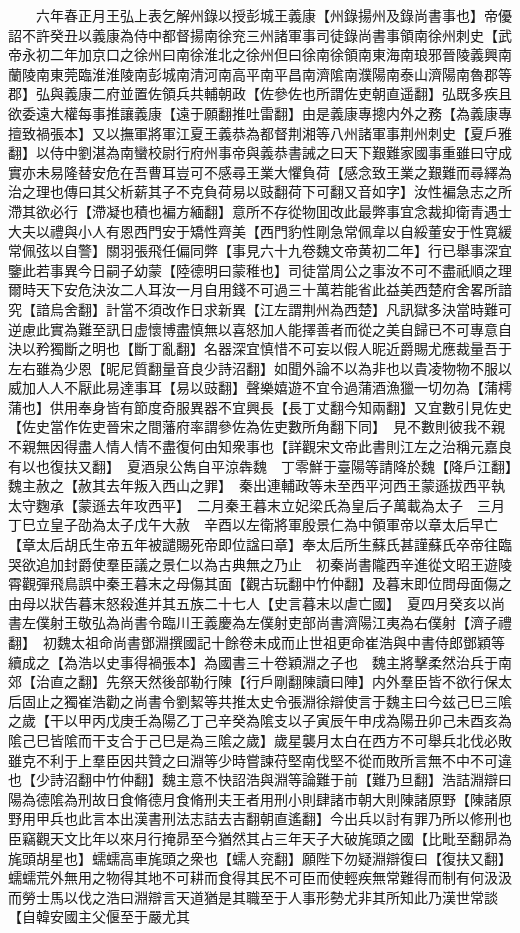 　　六年春正月王弘上表乞解州錄以授彭城王義康【州錄揚州及錄尚書事也】帝優詔不許癸丑以義康為侍中都督揚南徐兖三州諸軍事司徒錄尚書事領南徐州刺史【武帝永初二年加京口之徐州曰南徐淮北之徐州但曰徐南徐領南東海南琅邪晉陵義興南蘭陵南東莞臨淮淮陵南彭城南清河南高平南平昌南濟隂南濮陽南泰山濟陽南魯郡等郡】弘與義康二府並置佐領兵共輔朝政【佐參佐也所謂佐吏朝直遥翻】弘既多疾且欲委遠大權每事推讓義康【遠于願翻推吐雷翻】由是義康專摠内外之務【為義康專擅致禍張本】又以撫軍將軍江夏王義恭為都督荆湘等八州諸軍事荆州刺史【夏戶雅翻】以侍中劉湛為南蠻校尉行府州事帝與義恭書誡之曰天下艱難家國事重雖曰守成實亦未易隆替安危在吾曹耳豈可不感尋王業大懼負荷【感念致王業之艱難而尋繹為治之理也傳曰其父析薪其子不克負荷易以豉翻荷下可翻又音如字】汝性褊急志之所滯其欲必行【滯凝也積也褊方緬翻】意所不存從物囬改此最弊事宜念裁抑衛青遇士大夫以禮與小人有恩西門安于矯性齊美【西門豹性剛急常佩韋以自綏董安于性寛緩常佩弦以自警】關羽張飛任偏同弊【事見六十九卷魏文帝黄初二年】行已舉事深宜鑒此若事異今日嗣子幼蒙【陸德明曰蒙稚也】司徒當周公之事汝不可不盡祇順之理爾時天下安危決汝二人耳汝一月自用錢不可過三十萬若能省此益美西楚府舍畧所諳究【諳烏舍翻】計當不須改作日求新異【江左謂荆州為西楚】凡訊獄多決當時難可逆慮此實為難至訊日虚懷博盡慎無以喜怒加人能擇善者而從之美自歸已不可專意自決以矜獨斷之明也【斷丁亂翻】名器深宜慎惜不可妄以假人昵近爵賜尤應裁量吾于左右雖為少恩【昵尼質翻量音良少詩沼翻】如聞外論不以為非也以貴凌物物不服以威加人人不厭此易達事耳【易以豉翻】聲樂嬉遊不宜令過蒲酒漁獵一切勿為【蒲樗蒲也】供用奉身皆有節度奇服異器不宜興長【長丁丈翻今知兩翻】又宜數引見佐史【佐史當作佐吏晉宋之間藩府率謂參佐為佐吏數所角翻下同】　見不數則彼我不親不親無因得盡人情人情不盡復何由知衆事也【詳觀宋文帝此書則江左之治稱元嘉良有以也復扶又翻】　夏酒泉公雋自平涼犇魏　丁零鮮于臺陽等請降於魏【降戶江翻】魏主赦之【赦其去年叛入西山之罪】　秦出連輔政等未至西平河西王蒙遜拔西平執太守麴承【蒙遜去年攻西平】　二月秦王暮末立妃梁氏為皇后子萬載為太子　三月丁巳立皇子劭為太子戊午大赦　辛酉以左衛將軍殷景仁為中領軍帝以章太后早亡【章太后胡氏生帝五年被譴賜死帝即位諡曰章】奉太后所生蘇氏甚謹蘇氏卒帝往臨哭欲追加封爵使羣臣議之景仁以為古典無之乃止　初秦尚書隴西辛進從文昭王遊陵霄觀彈飛鳥誤中秦王暮末之母傷其面【觀古玩翻中竹仲翻】及暮末即位問母面傷之由母以狀告暮末怒殺進并其五族二十七人【史言暮末以虐亡國】　夏四月癸亥以尚書左僕射王敬弘為尚書令臨川王義慶為左僕射吏部尚書濟陽江夷為右僕射【濟子禮翻】　初魏太祖命尚書鄧淵撰國記十餘卷未成而止世祖更命崔浩與中書侍郎鄧穎等續成之【為浩以史事得禍張本】為國書三十卷穎淵之子也　魏主將擊柔然治兵于南郊【治直之翻】先祭天然後部勒行陳【行戶剛翻陳讀曰陣】内外羣臣皆不欲行保太后固止之獨崔浩勸之尚書令劉絜等共推太史令張淵徐辯使言于魏主曰今兹己巳三隂之歲【干以甲丙戊庚壬為陽乙丁己辛癸為隂支以子寅辰午申戌為陽丑卯己未酉亥為隂己巳皆隂而干支合于己巳是為三隂之歲】歲星襲月太白在西方不可舉兵北伐必敗雖克不利于上羣臣因共贊之曰淵等少時嘗諫苻堅南伐堅不從而敗所言無不中不可違也【少詩沼翻中竹仲翻】魏主意不快詔浩與淵等論難于前【難乃旦翻】浩詰淵辯曰陽為德隂為刑故日食脩德月食脩刑夫王者用刑小則肆諸市朝大則陳諸原野【陳諸原野用甲兵也此言本出漢書刑法志詰去吉翻朝直遙翻】今出兵以討有罪乃所以修刑也臣竊觀天文比年以來月行掩昴至今猶然其占三年天子大破旄頭之國【比毗至翻昴為旄頭胡星也】蠕蠕高車旄頭之衆也【蠕人兖翻】願陛下勿疑淵辯復曰【復扶又翻】蠕蠕荒外無用之物得其地不可耕而食得其民不可臣而使輕疾無常難得而制有何汲汲而勞士馬以伐之浩曰淵辯言天道猶是其職至于人事形勢尤非其所知此乃漢世常談【自韓安國主父偃至于嚴尤其